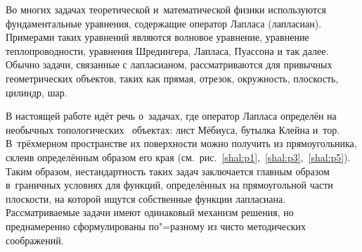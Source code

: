 




\date{20/XII/2010} %



\maketitle


Во многих задачах теоретической и~математической физики используются фундаментальные уравнения, содержащие оператор Лапласа (лапласиан). 
Примерами таких уравнений являются волновое уравнение, уравнение теплопроводности, уравнения Шредингера, Лапласа, Пуассона и так далее. 
Обычно задачи, связанные с лапласианом, рассматриваются для привычных геометрических объектов, таких как прямая, отрезок, окружность, плоскость, цилиндр, шар.

В настоящей работе идёт речь о~задачах, где оператор Лапласа определён на необычных топологических~\cite{shal:topology} объектах: лист Мёбиуса, бутылка Клейна и~тор. 
В~трёхмерном пространстве их поверхности можно получить из прямоугольника, склеив определённым образом его края (см.~рис.~\ref{shal:p1},~\ref{shal:p3},~\ref{shal:p5}). 
Таким образом, нестандартность таких задач заключается главным образом в~граничных условиях для функций, определённых на прямоугольной части плоскости, на которой ищутся собственные функции лапласиана. 
Рассматриваемые задачи имеют одинаковый механизм решения, но преднамеренно сформулированы по"=разному из чисто методических соображений. 



